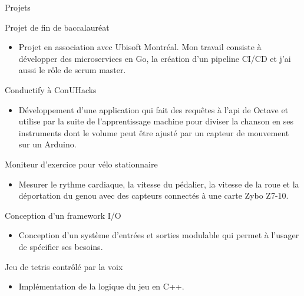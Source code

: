 \documentclass{article}
\newlength{\tabin}
\newlength{\secsep}
\newcommand{\lineunder}{\vspace*{-8pt} \\ \hspace*{-6pt} \hrulefill \\ \vspace*{-15pt}}
\newenvironment{tabbedsection}[1]{
  \begin{list}{}{
      \setlength{\itemsep}{0pt}
      \setlength{\labelsep}{0pt}
      \setlength{\labelwidth}{0pt}
      \setlength{\leftmargin}{\tabin}
      \setlength{\rightmargin}{\tabin}
      \setlength{\listparindent}{0pt}
      \setlength{\parsep}{0pt}
      \setlength{\parskip}{0pt}
      \setlength{\partopsep}{0pt}
      \setlength{\topsep}{#1}
    }
  \item[]
}{\end{list}}
\newenvironment{resume_section}[1]{
  \filbreak
  \vspace{2\secsep}
  \textsc{\large#1}
  \lineunder
  \begin{tabbedsection}{\secsep}
}{\end{tabbedsection}}
\newenvironment{resume_subsection}[2][]{
  \textbf{#2} \hfill {\footnotesize #1} \hspace{2em}
  \begin{tabbedsection}{0.5\secsep}
}{\end{tabbedsection}}
\newenvironment{subitems}{
  \renewcommand{\labelitemi}{-}
  \begin{itemize}
      \setlength{\labelsep}{1em}
}{\end{itemize}}
\begin{document}
\begin{resume_section}{Projets}
 \begin{resume_subsection}{Projet de fin de baccalauréat}
  \begin{subitems}
    \item Projet en association avec Ubisoft Montréal. Mon travail consiste à développer des microservices en Go, la création d'un pipeline CI/CD et j'ai aussi le rôle de scrum master.
    \end{subitems}
  \end{resume_subsection}
 
  \begin{resume_subsection}[Janvier 2020]{Conductify à ConUHacks}
  \begin{subitems}
    \item Développement d'une application qui fait des requêtes à l'api de Octave et utilise par la suite de l'apprentissage machine pour diviser la chanson en ses instruments dont le volume peut être ajusté par un capteur de mouvement sur un Arduino.
    \end{subitems}
  \end{resume_subsection}
  
  \begin{resume_subsection}[Hiver 2019]{Moniteur d'exercice pour vélo stationnaire}
  \begin{subitems}
    \item Mesurer le rythme cardiaque, la vitesse du pédalier, la vitesse de la roue et la déportation du genou avec des capteurs connectés à une carte Zybo Z7-10. 
    \end{subitems}
  \end{resume_subsection}

  \begin{resume_subsection}[Été 2018]{Conception d'un framework I/O}
  \begin{subitems}
    \item Conception d’un système d’entrées et sorties modulable qui permet à l’usager de spécifier ses besoins.
    \end{subitems}
  \end{resume_subsection}

  \begin{resume_subsection}[Hiver 2018]{Jeu de tetris contrôlé par la voix}
    \begin{subitems}
        \item Implémentation de la logique du jeu en C++.
    \end{subitems}
  \end{resume_subsection}
  

\end{resume_section}
\end{document}
